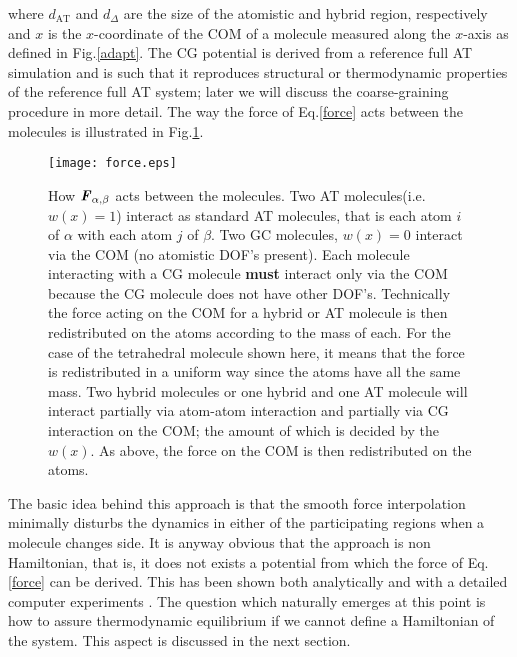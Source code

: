 \documentclass[aps,pre,preprint]{revtex4}
\renewcommand{\v}[1]{\textbf{\textit{#1}}}
\begin{document}
where $d_{\textrm{AT}}$ and $d_{{\Delta}}$ are the size of the
atomistic and hybrid region, respectively and $x$ is the $x$-coordinate of the COM of a molecule measured along the $x$-axis as defined in Fig.\ref{adapt}.
The CG potential is derived from a reference full AT simulation and is such that it reproduces structural or thermodynamic properties of the reference full AT system; later we will discuss the coarse-graining procedure in more detail. The way the force of Eq.\ref{force} acts between the molecules is illustrated in Fig.\ref{inter}. 
\begin{figure}
  \centering
  \texttt{[image: force.eps]}
  \caption{How ${\v F}_{\alpha,\beta}$ acts between the molecules. Two AT molecules(i.e. $w(x)=1$)  interact as standard AT molecules, that is each atom $i$ of $\alpha$ with each atom $j$ of $\beta$. Two GC molecules, $w(x)=0$ interact via the COM (no atomistic DOF's present). Each molecule interacting with a CG molecule {\bf must} interact only via the COM because the CG molecule does not have other DOF's. Technically the force acting on the COM for a hybrid or AT molecule is then redistributed on the atoms according to the mass of each. For the case of the tetrahedral molecule shown here, it means that the force is redistributed in a uniform way since the atoms have all the same mass. Two hybrid molecules or one hybrid and one AT molecule will interact partially via atom-atom interaction and partially via CG interaction on the COM; the amount of which is decided by the $w(x)$. As above, the force on the COM is then redistributed on the atoms.}
  \label{inter}
\end{figure} 
The basic idea behind this approach is that the smooth force interpolation minimally disturbs the dynamics in either of the
participating regions when a molecule changes side.
It is anyway obvious that the approach is non Hamiltonian, that is, it does not exists a potential from which the force of Eq.\ref{force} can be derived. This has been shown both analytically \cite{presolo} and with a detailed computer experiments \cite{prlcomm}. The question which naturally emerges at this point is how to assure thermodynamic equilibrium if we cannot define a Hamiltonian of the system. This aspect is discussed in the next section.
\end{document}
